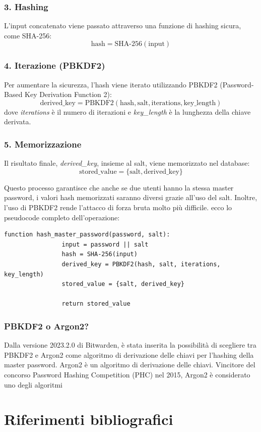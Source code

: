 \documentclass[a4paper,12pt]{report}
\begin{document}
		\subsection*{3. Hashing}
		L'input concatenato viene passato attraverso una funzione di hashing sicura, come SHA-256:
		\[
		\text{hash} = \text{SHA-256}(\text{input})
		\]

		\subsection*{4. Iterazione (PBKDF2)}
		Per aumentare la sicurezza, l'hash viene iterato utilizzando PBKDF2 (Password-Based Key Derivation Function 2):
		\[
		\text{derived\_key} = \text{PBKDF2}(\text{hash}, \text{salt}, \text{iterations}, \text{key\_length})
		\]
		dove \textit{iterations} è il numero di iterazioni e \textit{key\_length} è la lunghezza della chiave derivata.

		\subsection*{5. Memorizzazione}
		Il risultato finale, \textit{derived\_key}, insieme al salt, viene memorizzato nel database:
		\[
		\text{stored\_value} = \{\text{salt}, \text{derived\_key}\}
		\]

		Questo processo garantisce che anche se due utenti hanno la stessa master password, i valori hash memorizzati saranno diversi grazie all'uso del salt. Inoltre, l'uso di PBKDF2 rende l'attacco di forza bruta molto più difficile.
		ecco lo pseudocode completo dell'operazione:
		\begin{lstlisting}[style=pseudocode]
			function hash_master_password(password, salt):
				input = password || salt
				hash = SHA-256(input)
				derived_key = PBKDF2(hash, salt, iterations, key_length)
				stored_value = {salt, derived_key}
				
				return stored_value
		\end{lstlisting}
		\subsection*{PBKDF2 o Argon2?}
		Dalla versione 2023.2.0 di Bitwarden, è stata inserita la possibilità
		di scegliere tra PBKDF2 e Argon2 come algoritmo di derivazione delle
		chiavi per l'hashing della master password. Argon2 è un algoritmo di
		derivazione delle chiavi. Vincitore del concorso Password Hashing
		Competition (PHC) nel 2015, Argon2 è considerato uno degli algoritmi

	\newpage
	
	\renewcommand{\bibsection}{}
	\chapter*{Riferimenti bibliografici}
	
\end{document}
